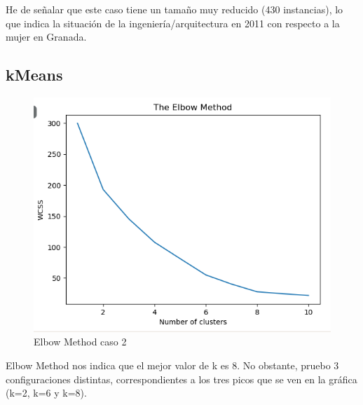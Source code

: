 He de señalar que este caso tiene un tamaño muy reducido (430 instancias), lo que indica la situación de la ingeniería/arquitectura en 2011 con respecto a la mujer en Granada.

\subsection{kMeans}

\begin{figure}[H] %
	\centering
	\includegraphics[scale=0.4]{em-2.png}  %
	\caption{Elbow Method caso 2} 
	\label{fig:em-caso2}
\end{figure}

Elbow Method nos indica que el mejor valor de k es 8. No obstante, pruebo 3 configuraciones distintas, correspondientes a los tres picos que se ven en la gráfica (k=2, k=6 y k=8).

